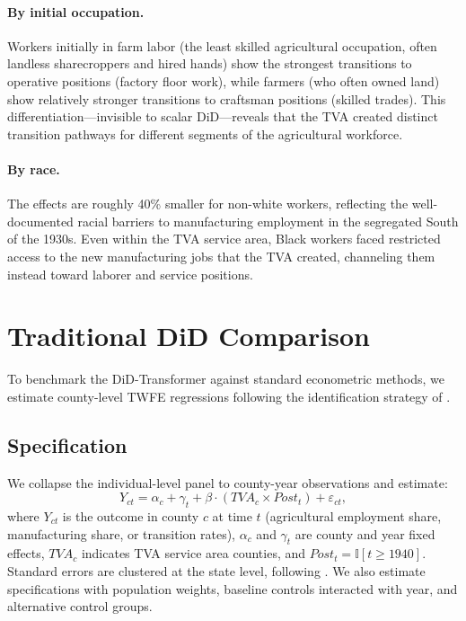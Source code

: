 \documentclass[12pt]{article}
\newcommand{\ind}{\mathbb{I}}
\begin{document}
\paragraph{By initial occupation.} Workers initially in farm labor (the least skilled agricultural occupation, often landless sharecroppers and hired hands) show the strongest transitions to operative positions (factory floor work), while farmers (who often owned land) show relatively stronger transitions to craftsman positions (skilled trades). This differentiation---invisible to scalar DiD---reveals that the TVA created distinct transition pathways for different segments of the agricultural workforce.

\paragraph{By race.} The effects are roughly 40\% smaller for non-white workers, reflecting the well-documented racial barriers to manufacturing employment in the segregated South of the 1930s. Even within the TVA service area, Black workers faced restricted access to the new manufacturing jobs that the TVA created, channeling them instead toward laborer and service positions.


\section{Traditional DiD Comparison}\label{sec:traditional}

To benchmark the DiD-Transformer against standard econometric methods, we estimate county-level TWFE regressions following the identification strategy of \citet{klineMoretti2014local}.

\subsection{Specification}

We collapse the individual-level panel to county-year observations and estimate:
\begin{equation}\label{eq:twfe}
Y_{ct} = \alpha_c + \gamma_t + \beta \cdot (TVA_c \times Post_t) + \varepsilon_{ct},
\end{equation}
where $Y_{ct}$ is the outcome in county $c$ at time $t$ (agricultural employment share, manufacturing share, or transition rates), $\alpha_c$ and $\gamma_t$ are county and year fixed effects, $TVA_c$ indicates TVA service area counties, and $Post_t = \ind[t \geq 1940]$. Standard errors are clustered at the state level, following \citet{klineMoretti2014local}. We also estimate specifications with population weights, baseline controls interacted with year, and alternative control groups.
\end{document}
